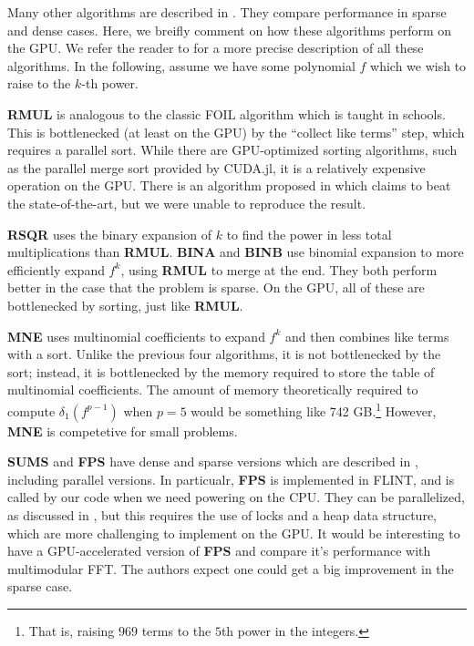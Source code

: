 Many other algorithms are described in \cite{monagan-2012-sparse-powering}. 
They compare performance in sparse and dense cases. 
Here, we breifly comment on how these algorithms perform on the GPU.
We refer the reader to \cite{monagan-2012-sparse-powering}
for a more precise description of all these algorithms.
In the following, assume we have some polynomial \(f\) which we wish 
to raise to the \(k\)-th power.

\textbf{RMUL} is analogous to the classic FOIL algorithm which is taught in schools. 
This is bottlenecked (at least on the GPU) by the ``collect like terms'' step, 
which requires a parallel sort.
While there are GPU-optimized sorting algorithms, such as the parallel merge sort
provided by CUDA.jl, it is a relatively expensive operation on the GPU.
There is an algorithm proposed in \cite{gupta-2023-gpu-sort}
which claims to beat the state-of-the-art, but we were unable to reproduce the result.

\textbf{RSQR} uses the binary expansion of \(k\) to find the power in less
total multiplications than \textbf{RMUL}.
\textbf{BINA} and \textbf{BINB} use binomial expansion to more efficiently 
expand \(f^{k}\), using \textbf{RMUL} to merge at the end.
They both perform better in the case that the problem is sparse.
On the GPU, all of these are bottlenecked by sorting, just like
\textbf{RMUL}.

\textbf{MNE} uses multinomial coefficients to expand \(f^{k}\) 
and then combines like terms with a sort. 
Unlike the previous four algorithms, it is not bottlenecked by the sort;
instead, it is bottlenecked by the memory required to store the table of
multinomial coefficients. 
The amount of memory theoretically required to compute 
$\delta_1(f ^ {p - 1})$ when \(p=5\) 
would be something like 742 GB.\footnote{
	That is, raising 
    $969$ terms to the $5$th power
	in the integers.
}
However, \textbf{MNE} is competetive for small problems.

\textbf{SUMS} and \textbf{FPS} have dense and sparse versions which are described in 
\cite{monagan-2012-sparse-powering}, including parallel versions.
In particualr, \textbf{FPS} is implemented in FLINT, and is called by our
code when we need powering on the CPU.
They can be parallelized, as discussed in \cite{monagan-2012-sparse-powering},
but this requires the use of locks and a heap data structure,
which are more challenging to implement on the GPU.
It would be interesting to have a GPU-accelerated version of
\textbf{FPS} and compare it's performance with 
multimodular FFT.
The authors expect one could get a big improvement in the sparse case.




